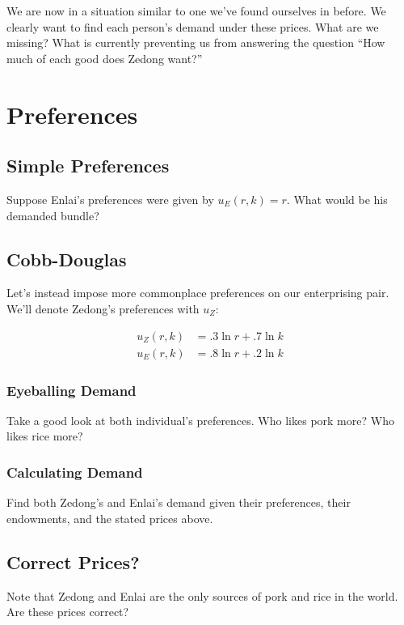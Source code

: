\documentclass{article}
\begin{document}
We are now in a situation similar to one we've found ourselves in before. We clearly want to find each person's demand under these prices. What are we missing? What is currently preventing us from answering the question ``How much of each good does Zedong want?''

\section{Preferences}

\subsection{Simple Preferences}

Suppose Enlai's preferences were given by $u_E(r, k) = r$. What would be his demanded bundle?

\subsection{Cobb-Douglas}

Let's instead impose more commonplace preferences on our enterprising pair. We'll denote Zedong's preferences with $u_Z$:

\begin{align*}
u_Z(r, k) &= .3 \ln r + .7 \ln k \\
u_E(r, k) &= .8 \ln r + .2 \ln k
\end{align*}

\subsubsection{Eyeballing Demand}

Take a good look at both individual's preferences. Who likes pork more? Who likes rice more?

\subsubsection{Calculating Demand}

Find both Zedong's and Enlai's demand given their preferences, their endowments, and the stated prices above.

\subsection{Correct Prices?}

Note that Zedong and Enlai are the only sources of pork and rice in the world. Are these prices correct?
\end{document}

